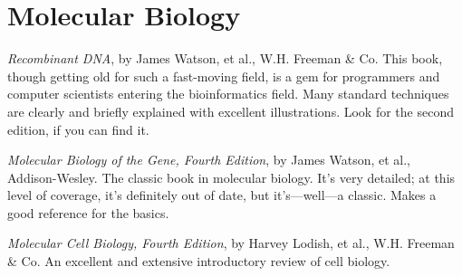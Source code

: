 \section{Molecular Biology}
\textit{Recombinant DNA}, by James Watson, et al., W.H. Freeman \& Co. This book, though getting old for such a fast-moving field, is a gem for programmers and computer scientists entering the bioinformatics field. Many standard techniques are clearly and briefly explained with excellent illustrations. Look for the second edition, if you can find it.

\textit{Molecular Biology of the Gene, Fourth Edition}, by James Watson, et al., Addison-Wesley. The classic book in molecular biology. It's very detailed; at this level of coverage, it's definitely out of date, but it's—well—a classic. Makes a good reference for the basics.

\textit{Molecular Cell Biology, Fourth Edition}, by Harvey Lodish, et al., W.H.  Freeman \& Co. An excellent and extensive introductory review of cell biology.
